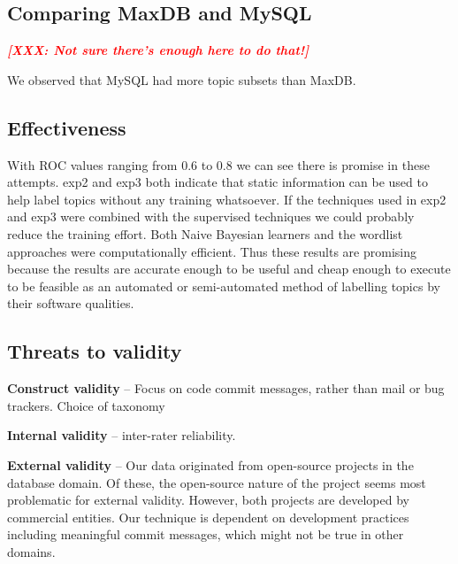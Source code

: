 \documentclass{acm_proc_article-sp}
\newcommand{\XXX}[1]{\textcolor{red}{{\it \textbf{[XXX: #1]}}}}
\begin{document}
\subsection{Comparing MaxDB and MySQL}

\XXX{Not sure there's enough here to do that!}

We observed that MySQL had more topic subsets than MaxDB.



\subsection{Effectiveness}


With ROC values ranging from $0.6$ to $0.8$ we can see there is promise in these attempts. \textsf{exp2} and \textsf{exp3} both indicate that static information can be used to help label topics without any training whatsoever. If the techniques used in \textsf{exp2} and \textsf{exp3} were combined with the supervised techniques we could probably reduce the training effort. 
Both Naive Bayesian learners and the wordlist approaches were computationally efficient. Thus these results are promising because the results are accurate enough to be useful and cheap enough to execute to be feasible as an automated or semi-automated method of labelling topics by their software qualities.



\subsection{Threats to validity}
\textbf{Construct validity} -- Focus on code commit messages, rather than mail or bug trackers. Choice of taxonomy

\textbf{Internal validity} -- inter-rater reliability.

\textbf{External validity} -- Our data originated from open-source projects in the database domain. Of these, the open-source nature of the project seems most problematic for external validity. However, both projects are developed by commercial entities. Our technique is dependent on development practices including meaningful commit messages, which might not be true in other domains.
\end{document}
